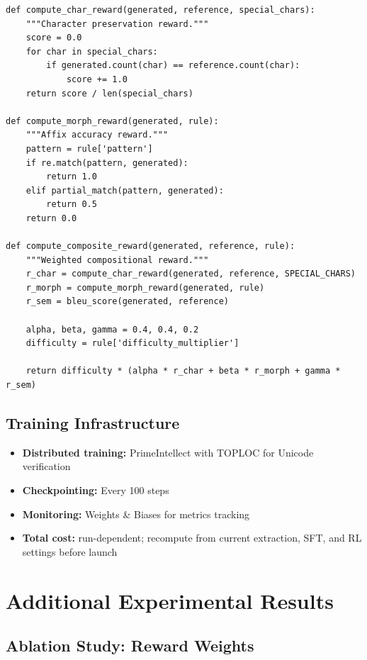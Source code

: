 \documentclass{article}
\begin{document}
\begin{verbatim}
def compute_char_reward(generated, reference, special_chars):
    """Character preservation reward."""
    score = 0.0
    for char in special_chars:
        if generated.count(char) == reference.count(char):
            score += 1.0
    return score / len(special_chars)

def compute_morph_reward(generated, rule):
    """Affix accuracy reward."""
    pattern = rule['pattern']
    if re.match(pattern, generated):
        return 1.0
    elif partial_match(pattern, generated):
        return 0.5
    return 0.0

def compute_composite_reward(generated, reference, rule):
    """Weighted compositional reward."""
    r_char = compute_char_reward(generated, reference, SPECIAL_CHARS)
    r_morph = compute_morph_reward(generated, rule)
    r_sem = bleu_score(generated, reference)
    
    alpha, beta, gamma = 0.4, 0.4, 0.2
    difficulty = rule['difficulty_multiplier']
    
    return difficulty * (alpha * r_char + beta * r_morph + gamma * r_sem)
\end{verbatim}

\subsection{Training Infrastructure}

\begin{itemize}
    \item \textbf{Distributed training:} PrimeIntellect with TOPLOC for Unicode verification
    \item \textbf{Checkpointing:} Every 100 steps
    \item \textbf{Monitoring:} Weights \& Biases for metrics tracking
    \item \textbf{Total cost:} run-dependent; recompute from current extraction, SFT, and RL settings before launch
\end{itemize}

\section{Additional Experimental Results}
\label{appendix:additional_results}

\subsection{Ablation Study: Reward Weights}
\end{document}
